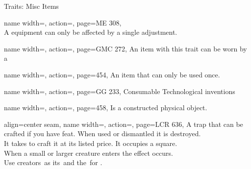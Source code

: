 \begin{PageFront}
\begin{Tables}{\frontTableHeight}
\begin{Table}{Traits: Misc Items}
\begin{entry}{}{%
                name width=\conditionLength,%
                action=\Adjustment,
                page=ME 308,
            }
{                }\\ A equipment can only be affected by a single adjustment. \hfill {}
            \end{entry}
            \begin{entry}{}{%
                name width=\conditionLength,%
                action=\Companion,
                page=GMC 272,
            }
                An item with this trait can be worn by a 
            \end{entry}
            \begin{entry}{}{%
                name width=\conditionLength,%
                action=\Consumable,
                page=454,
            }
                An item that can only be used once. \hfill {}
            \end{entry}
            \begin{entry}{}{%
                name width=\conditionLength,%
                action=\Gadget,
                page=GG 233,
            }
                Consumable Technological inventions
            \end{entry}
            \begin{entry}{}{%
                name width=\conditionLength,%
                action=\Mechanical,
                page=458,
            }
                Is a constructed physical object.
            \end{entry}
            \begin{entry}{}{%
                align=center seam,
                name width=\conditionLength,%
                action=\Snare,
                page=LCR 636,
            }
                A trap that can be crafted if you have
                 feat. When used or dismantled it is destroyed.\\
                It takes  to craft it at its listed price. It occupies a  \Feet square. \hfill {}\\
                When a small or larger creature enters the effect occurs.\\
                Use creators \CraftingT \DC\,as its \StealthT \DC\,and the \DC\,for . \hfill {}
            \end{entry}

\end{Table}
\end{Tables}
\end{PageFront}
